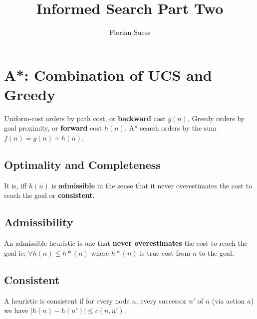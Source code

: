 \documentclass{article}
\begin{document}
\title{Informed Search Part Two}
\date{}
\author{Florian Suess}
\maketitle

\section{A*: Combination of UCS and Greedy}
Uniform-cost orders by path cost, or \textbf{backward} cost $g(n)$, Greedy orders by goal proximity, or \textbf{forward} cost $h(n)$. A* search orders by the sum $f(n) = g(n) + h(n)$.

\subsection{Optimality and Completeness}
It is, iff $h(n)$ is \textbf{admissible} in the sense that it never overestimates the cost to reach the goal or \textbf{consistent}.

\subsection{Admissibility}
An admissible heuristic is one that \textbf{never overestimates} the cost to reach the goal ie; $\forall h(n) \leq h * (n)$ where $h * (n)$ is true cost from $n$ to the goal.

\subsection{Consistent}
A heuristic is consistent if for every node $n$, every successor $n'$ of $n$ (via action $a$) we have $|h(n) - h(n')| \leq c(n,n')$.
\end{document}
